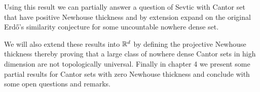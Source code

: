 Using this result we can partially answer a question of Sevtic\cite{Svetic} with Cantor set that have positive Newhouse thickness and by extension expand on the original Erd\H{o}'s similarity conjecture for some uncountable nowhere dense set. 

\medskip

We will also extend these results into $\mathbb{R}^d$ by defining the projective Newhouse thickness thereby proving that a large class of nowhere dense Cantor sets in high dimension are not topologically universal.   Finally in chapter 4 we present some partial results for Cantor sets with zero Newhouse thickness and conclude with some open questions and remarks.  


